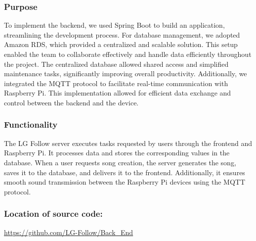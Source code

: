 \documentclass[conference]{IEEEtran}
\begin{document}
\subsubsection{Purpose}
\noindent To implement the backend, we used Spring Boot to build an application, streamlining the development process. For database management, we adopted Amazon RDS, which provided a centralized and scalable solution. This setup enabled the team to collaborate effectively and handle data efficiently throughout the project. The centralized database allowed shared access and simplified maintenance tasks, significantly improving overall productivity. Additionally, we integrated the MQTT protocol to facilitate real-time communication with Raspberry Pi. This implementation allowed for efficient data exchange and control between the backend and the device.\\

\subsubsection{Functionality}
\noindent The LG Follow server executes tasks requested by users through the frontend and Raspberry Pi. It processes data and stores the corresponding values in the database. When a user requests song creation, the server generates the song, saves it to the database, and delivers it to the frontend. Additionally, it ensures smooth sound transmission between the Raspberry Pi devices using the MQTT protocol.\\ 

\subsubsection{Location of source code: }
\url{https://github.com/LG-Follow/Back_End}\\
\end{document}
